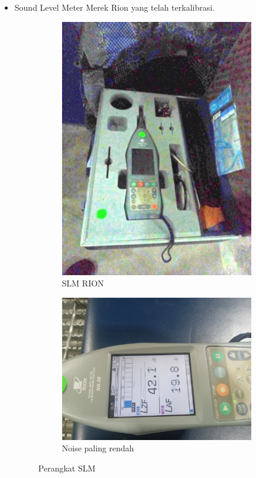 \documentclass{article}
\begin{document}
	\begin{itemize}
		\item Sound Level Meter Merek Rion yang telah terkalibrasi.

		\begin{figure}[H]
			\centering
			\begin{subfigure}[]{.35\textwidth}
				\includegraphics[width=\textwidth]{images/tools_slm_box}
				\caption{SLM RION}
			\end{subfigure}
			\begin{subfigure}[]{.25\textwidth}
				\includegraphics[width=\textwidth]{images/slm_lowest}
				\caption{Noise paling rendah}
			\end{subfigure}
			\caption{Perangkat SLM}
		\end{figure}


\end{itemize}
\end{document}
